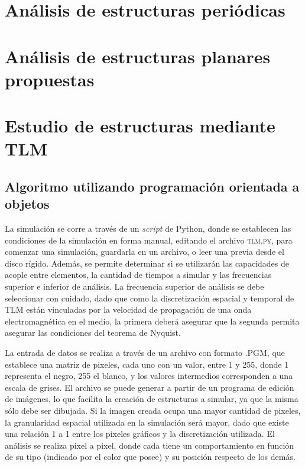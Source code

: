 
\section{Análisis de estructuras periódicas}
\label{sec_estructuras_periodicas}
\lipsum
\section{Análisis de estructuras planares propuestas}
\label{sec_estructuras_propuestas}
\lipsum
\lipsum
\section{Estudio de estructuras mediante TLM}
\label{sec_estudio_tlm}
\lipsum

\subsection{Algoritmo utilizando programación orientada a objetos}
\label{subsec_estudio_tlm}
La simulación se corre a través de un \textit{script} de Python, donde se establecen las condiciones de la simulación en forma manual, editando el archivo \textsc{tlm.py}, para comenzar una simulación, guardarla en un archivo, o leer una previa desde el disco rígido. Además, se permite determinar si se utilizarán las capacidades de acople entre elementos, la cantidad de tiempos a simular y las frecuencias superior e inferior de análisis. La frecuencia superior de análisis se debe seleccionar con cuidado, dado que como la discretización espacial y temporal de TLM están vinculadas por la velocidad de propagación de una onda electromagnética en el medio, la primera deberá asegurar que la segunda permita asegurar las condiciones del teorema de Nyquist.

La entrada de datos se realiza a través de un archivo con formato \textsc{.PGM}, que establece una matriz de pixeles, cada uno con un valor, entre 1 y 255, donde 1 representa el negro, 255 el blanco, y los valores intermedios corresponden a una escala de grises. El archivo se puede generar a partir de un programa de edición de imágenes, lo que facilita la creación de estructuras a simular, ya que la misma sólo debe ser dibujada. Si la imagen creada ocupa una mayor cantidad de pixeles, la granularidad espacial utilizada en la simulación será mayor, dado que existe una relación 1 a 1 entre los pixeles gráficos y la discretización utilizada. El análisis se realiza pixel a pixel, donde cada tiene un comportamiento en función de su tipo (indicado por el color que posee) y su posición respecto de los demás.

